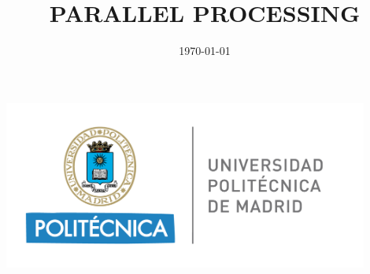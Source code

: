 \documentclass{article}
\title{\textbf{PARALLEL PROCESSING}}
\author{}
\date{\today}
\begin{document}
\begin{titlepage}
    \centering
    \maketitle
    \vspace{2cm}
    \includegraphics[width=0.9\textwidth]{upmlogo.png} 
    \vspace{1cm}
\end{titlepage}

\tableofcontents
\newpage
\end{document}
